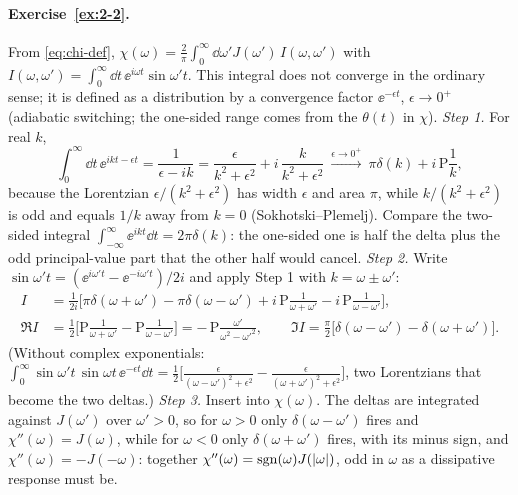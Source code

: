 \paragraph{Exercise~\ref{ex:2-2}.}
From \cref{eq:chi-def}, $\chi(\omega)=\tfrac2\pi\int_0^\infty\dd\omega'J(\omega')\,I(\omega,\omega')$ with $I(\omega,\omega')=\int_0^\infty\dd t\,\ee^{i\omega t}\sin\omega't$.
This integral does not converge in the ordinary sense; it is defined as a distribution by a convergence factor $\ee^{-\epsilon t}$, $\epsilon\to0^+$ (adiabatic switching; the one-sided range comes from the $\theta(t)$ in $\chi$).
\emph{Step 1.}
For real $k$,
\begin{equation*}
  \int_0^\infty\!\dd t\,\ee^{ikt-\epsilon t}=\frac{1}{\epsilon-ik}=\frac{\epsilon}{k^2+\epsilon^2}+i\,\frac{k}{k^2+\epsilon^2}
  \ \xrightarrow{\epsilon\to0^+}\ \pi\delta(k)+i\,\mathrm P\frac1k ,
\end{equation*}
because the Lorentzian $\epsilon/(k^2+\epsilon^2)$ has width $\epsilon$ and area $\pi$, while $k/(k^2+\epsilon^2)$ is odd and equals $1/k$ away from $k=0$ (Sokhotski--Plemelj).
Compare the two-sided integral $\int_{-\infty}^\infty\ee^{ikt}\dd t=2\pi\delta(k)$: the one-sided one is half the delta plus the odd principal-value part that the other half would cancel.
\emph{Step 2.}
Write $\sin\omega't=(\ee^{i\omega't}-\ee^{-i\omega't})/2i$ and apply Step 1 with $k=\omega\pm\omega'$:
\begin{align*}
  I&=\frac{1}{2i}\Big[\pi\delta(\omega+\omega')-\pi\delta(\omega-\omega')+i\,\mathrm P\frac{1}{\omega+\omega'}-i\,\mathrm P\frac{1}{\omega-\omega'}\Big],\\
  \Re I&=\frac12\Big[\mathrm P\frac{1}{\omega+\omega'}-\mathrm P\frac{1}{\omega-\omega'}\Big]=-\,\mathrm P\frac{\omega'}{\omega^2-\omega'^2},\qquad
  \Im I=\frac\pi2\big[\delta(\omega-\omega')-\delta(\omega+\omega')\big].
\end{align*}
(Without complex exponentials: $\int_0^\infty\sin\omega't\,\sin\omega t\,\ee^{-\epsilon t}\dd t =\tfrac12\big[\tfrac{\epsilon}{(\omega-\omega')^2+\epsilon^2}-\tfrac{\epsilon}{(\omega+\omega')^2+\epsilon^2}\big]$, two Lorentzians that become the two deltas.)
\emph{Step 3.}
Insert into $\chi(\omega)$.
The deltas are integrated against $J(\omega')$ over $\omega'>0$, so for $\omega>0$ only $\delta(\omega-\omega')$ fires and $\chi''(\omega)=J(\omega)$, while for $\omega<0$ only $\delta(\omega+\omega')$ fires, with its minus sign, and $\chi''(\omega)=-J(-\omega)$: together $\chi''(\omega)=\operatorname{sgn}(\omega)J(|\omega|)$, odd in $\omega$ as a dissipative response must be.
